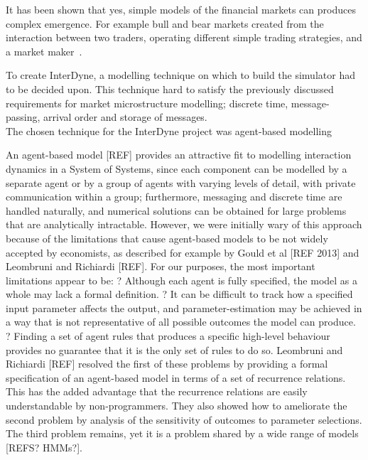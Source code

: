 \documentclass{article}
\begin{document}


It has been shown that yes, simple models of the financial markets can produces complex emergence. For example bull and bear markets created from the interaction between two traders, operating different simple trading strategies, and a market maker~\cite{bearandbull}.

To create InterDyne, a modelling technique on which to build the simulator had to be decided upon. This technique hard to satisfy the previously discussed requirements for market microstructure modelling; discrete time, message-passing, arrival order and storage of messages.\\
The chosen technique for the InterDyne project was agent-based modelling \cite{abm1}



An agent-based model [REF] provides an attractive fit to modelling interaction dynamics in a System of Systems, since each component can be modelled by a separate agent or by a group of agents with varying levels of detail, with private communication within a group; furthermore, messaging and discrete time are handled naturally, and numerical solutions can be obtained for large problems that are analytically intractable.  However, we were initially wary of this approach because of the limitations that cause agent-based models to be not widely accepted by economists, as described for example by Gould et al [REF 2013] and Leombruni and Richiardi [REF].  For our purposes, the most important limitations appear to be:
?	Although each agent is fully specified, the model as a whole may lack a formal definition.
?	It can be difficult to track how a specified input parameter affects the output, and parameter-estimation may be achieved in a way that is not representative of all possible outcomes the model can produce. 
?	Finding a set of agent rules that produces a specific high-level behaviour provides no guarantee that it is the only set of rules to do so.
Leombruni and Richiardi [REF] resolved the first of these problems by providing a formal specification of an agent-based model in terms of a set of recurrence relations. This has the added advantage that the recurrence relations are easily understandable by non-programmers.  They also showed how to ameliorate the second problem by analysis of the sensitivity of outcomes to parameter selections.  The third problem remains, yet it is a problem shared by a wide range of models [REFS? HMMs?].
\end{document}
